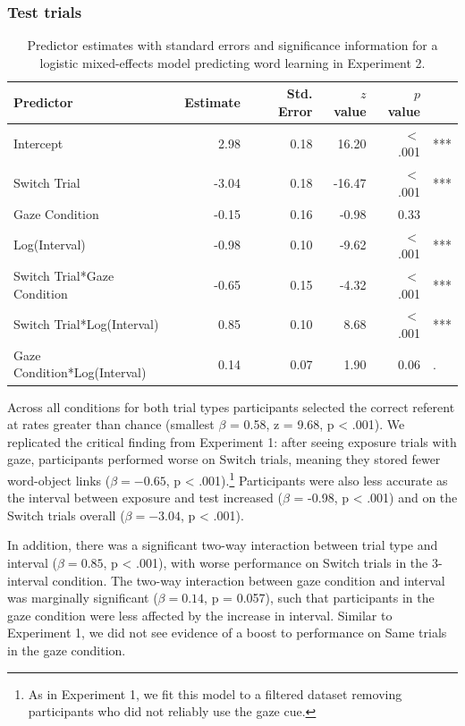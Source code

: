 \documentclass[authoryear, review]{elsarticle}
\begin{document}
\subsubsection{Test trials}\label{test-trials-1}

\begin{table}[tb]
\centering
\begin{tabular}{lrrrrl}
 Predictor & Estimate & Std. Error & $z$ value & $p$ value &  \\ 
  \hline
Intercept & 2.98 & 0.18 & 16.20 & $<$ .001 & *** \\ 
  Switch Trial & -3.04 & 0.18 & -16.47 & $<$ .001 & *** \\ 
  Gaze Condition & -0.15 & 0.16 & -0.98 & 0.33 &  \\ 
  Log(Interval) & -0.98 & 0.10 & -9.62 & $<$ .001 & *** \\ 
  Switch Trial*Gaze Condition & -0.65 & 0.15 & -4.32 & $<$ .001 & *** \\ 
  Switch Trial*Log(Interval) & 0.85 & 0.10 & 8.68 & $<$ .001 & *** \\ 
  Gaze Condition*Log(Interval) & 0.14 & 0.07 & 1.90 & 0.06 & . \\ 
   \hline
\end{tabular}
\caption{Predictor estimates with standard errors and significance information for a logistic mixed-effects model predicting word learning in Experiment 2.} 
\label{tab:exp2_reg}
\end{table}

Across all conditions for both trial types participants selected the
correct referent at rates greater than chance (smallest \(\beta\) =
0.58, z = 9.68, p \textless{} .001). We replicated the critical finding
from Experiment 1: after seeing exposure trials with gaze, participants
performed worse on Switch trials, meaning they stored fewer word-object
links (\(\beta = -0.65\), p \textless{}
.001).\footnote{As in Experiment 1, we fit this model to a filtered dataset removing participants who did not reliably use the gaze cue.}
Participants were also less accurate as the interval between exposure
and test increased (\(\beta\) = -0.98, p \textless{} .001) and on the
Switch trials overall (\(\beta = -3.04\), p \textless{} .001).

In addition, there was a significant two-way interaction between trial
type and interval (\(\beta = 0.85\), p \textless{} .001), with worse
performance on Switch trials in the 3-interval condition. The two-way
interaction between gaze condition and interval was marginally
significant (\(\beta = 0.14\), p = 0.057), such that participants in the
gaze condition were less affected by the increase in interval. Similar
to Experiment 1, we did not see evidence of a boost to performance on
Same trials in the gaze condition.
\end{document}

